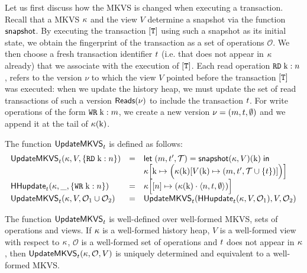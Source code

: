 Let us first discuss how the MKVS is changed when executing a transaction. 
Recall that a MKVS $\kappa$ and the view $V$ determine a snapshot 
via the function $\mathsf{snapshot}$. By executing the transaction $[\texttt{T}]$ using 
such a snapshot as its initial state, we obtain the fingerprint of the transaction 
as a set of operations $\mathcal{O}$. We then choose a fresh transaction identifier 
$t$ (i.e. that does not appear in $\kappa$ already) 
that we associate with the execution of $[\texttt{T}]$. 
Each read operation ${{\tt RD}}\;\mathrm{k}:n$, 
refers to the version $\nu$ to which the view $V$ pointed before the transaction $[\texttt{T}]$ 
was executed: when we update the history heap, we must update the set of read transactions of 
such a version $\mathsf{Reads}(\nu)$ to include the transaction $t$. For write 
operations of the form ${{\tt WR}}\;\mathrm{k}:m$, we create a new version 
$\nu = (m, t, \emptyset)$ and we append it at the tail of $\kappa(\mathrm{k})$.

\begin{definition}
The function $\mathsf{UpdateMKVS}_{t}$ is defined as follows:
\[
\begin{array}{lll}
\mathsf{UpdateMKVS}_{t}(\kappa, V, \{{{\tt RD}}\;\mathrm{k}: n\}) &=& 
\mathsf{let}\; (m, t', \mathcal{T}) = \mathsf{snapshot}(\kappa, V)(\mathrm{k}) \; \mathsf{in} \; \\
&&
\kappa\Big[ \mathrm{k} \mapsto  \Big( \kappa(\mathrm{k})  [ V(\mathrm{k}) \mapsto (m, t', \mathcal{T} \cup \{ t \} ) ] \Big) \Big]
\\
\mathsf{HHupdate}_{t}(\kappa, \_, \{{{\tt WR}}\; \mathrm{k}: n\}) &=& 
\kappa\Big[ [n] \mapsto ( \kappa(\mathrm{k}) \cdot \langle n, t, \emptyset \rangle) \Big]\\
\mathsf{UpdateMKVS}_{t}(\kappa, V, \mathcal{O}_1 \cup \mathcal{O}_2) &=& 
\mathsf{UpdateMKVS}_{t}(\mathsf{HHupdate}_{t}(\kappa, V, \mathcal{O}_1), V, \mathcal{O}_2)
\end{array}
\]
\end{definition}

\begin{lemma}
\label{lem:hhupdate.welldefined}
The function $\mathsf{UpdateMKVS}_{t}$ is well-defined over well-formed MKVS, sets of operations and 
views. If $\kappa$ is a well-formed history heap, $V$ is a well-formed view with respect 
to $\kappa$, $\mathcal{O}$ is a well-formed set of operations and $t$ does not 
appear in $\kappa$, then $\mathsf{UpdateMKVS}_{t}(\kappa, \mathcal{O}, V)$ is uniquely determined 
and equivalent to a well-formed MKVS.
\end{lemma}

